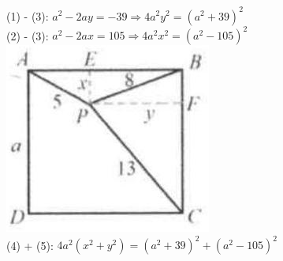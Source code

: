 \documentclass[10pt]{article}
\begin{document}
(1) - (3): \(a^{2}-2 a y=-39 \Rightarrow 4 a^{2} y^{2}=\left(a^{2}+39\right)^{2}\)\\
(2) - (3): \(a^{2}-2 a x=105 \Rightarrow 4 a^{2} x^{2}=\left(a^{2}-105\right)^{2}\)\\
\includegraphics[max width=\textwidth, center]{2025_04_17_97bc1f7e44d93c271a88g-080(3)}\\
(4) + (5): \(4 a^{2}\left(x^{2}+y^{2}\right)=\left(a^{2}+39\right)^{2}+\left(a^{2}-105\right)^{2}\)
\end{document}
